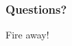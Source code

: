 \documentclass[handout,10pt]{beamer}
\begin{document}
\begin{frame}
	\frametitle{Questions?}
	\begin{center}
		Fire away!
	\end{center}
\end{frame}


\end{document}
